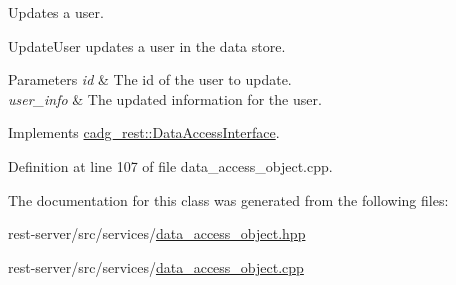 Updates a user. 

Update\+User updates a user in the data store.


\begin{DoxyParams}{Parameters}
{\em id} & The id of the user to update. \\
\hline
{\em user\+\_\+info} & The updated information for the user. \\
\hline
\end{DoxyParams}


Implements \mbox{\hyperlink{classcadg__rest_1_1_data_access_interface_ae44f7d277f8b8982869109e66333949a}{cadg\+\_\+rest\+::\+Data\+Access\+Interface}}.



Definition at line 107 of file data\+\_\+access\+\_\+object.\+cpp.



The documentation for this class was generated from the following files\+:\begin{DoxyCompactItemize}
\item 
rest-\/server/src/services/\mbox{\hyperlink{data__access__object_8hpp}{data\+\_\+access\+\_\+object.\+hpp}}\item 
rest-\/server/src/services/\mbox{\hyperlink{data__access__object_8cpp}{data\+\_\+access\+\_\+object.\+cpp}}\end{DoxyCompactItemize}
